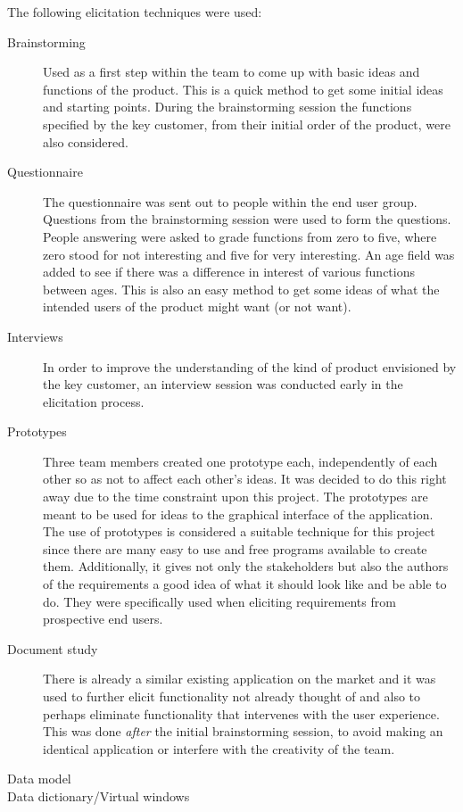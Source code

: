\documentclass[10pt,a4paper]{article}
\begin{document}
The following elicitation techniques were used:
\begin{description}
\item[Brainstorming] Used as a first step within the team to come up with basic ideas and functions of the product. This is a quick method to get some initial ideas and starting points. During the brainstorming session the functions specified by the key customer, from their initial order of the product, were also considered.

\item[Questionnaire] The questionnaire was sent out to people within the end user group. Questions from the brainstorming session were used to form the questions. People answering were asked to grade functions from zero to five, where zero stood for not interesting and five for very interesting. An age field was added to see if there was a difference in interest of various functions between ages. This is also an easy method to get some ideas of what the intended users of the product might want (or not want).

\item[Interviews] In order to improve the understanding of the kind of product envisioned by the key customer, an interview session was conducted early in the elicitation process. 

\item[Prototypes] Three team members created one prototype each, independently of each other so as not to affect each other's ideas. It was decided to do this right away due to the time constraint upon this project. The prototypes are meant to be used for ideas to the graphical interface of the application. The use of prototypes is considered a suitable technique for this project since there are many easy to use and free programs available to create them. Additionally, it gives not only the stakeholders but also the authors of the requirements a good idea of what it should look like and be able to do. They were specifically used when eliciting requirements from prospective end users.

\item[Document study] There is already a similar existing application on the market and it was used to further elicit functionality not already thought of and also to perhaps eliminate functionality that intervenes with the user experience. This was done \textit{after} the initial brainstorming session, to avoid making an identical application or interfere with the creativity of the team. 

\item[Data model]

\item[Data dictionary/Virtual windows]

\end{description}
\end{document}
